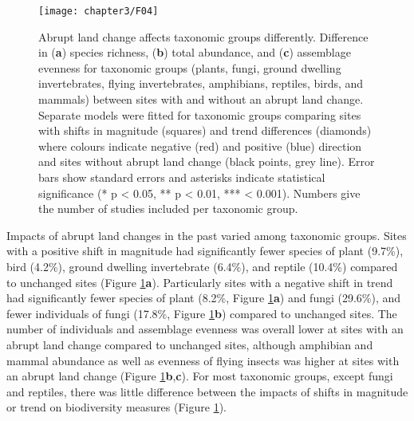 \begin{figure}[!htb]
\centering
\texttt{[image: chapter3/F04]}
\caption{Abrupt land change affects taxonomic groups differently. Difference in (\textbf{a}) species richness, (\textbf{b}) total abundance, and (\textbf{c}) assemblage evenness for taxonomic groups (plants, fungi, ground dwelling invertebrates, flying invertebrates, amphibians, reptiles, birds, and mammals) between sites with and without an abrupt land change. Separate models were fitted for taxonomic groups comparing sites with shifts in magnitude (squares) and trend differences (diamonds) where colours indicate negative (red) and positive (blue) direction and sites without abrupt land change (black points, grey line). Error bars show standard errors and asterisks indicate statistical significance (* p < 0.05, ** p < 0.01, *** < 0.001). Numbers give the number of studies included per taxonomic group.}
\label{F03_04}
\end{figure}

Impacts of abrupt land changes in the past varied among taxonomic groups. Sites with a positive shift in magnitude had significantly fewer species of plant (9.7\%), bird (4.2\%), ground dwelling invertebrate (6.4\%), and reptile (10.4\%) compared to unchanged sites (Figure \ref{F03_04}\textbf{a}). Particularly sites with a negative shift in trend had significantly fewer species of plant (8.2\%, Figure \ref{F03_04}\textbf{a}) and fungi (29.6\%), and fewer individuals of fungi (17.8\%, Figure \ref{F03_04}\textbf{b}) compared to unchanged sites. The number of individuals and assemblage evenness was overall lower at sites with an abrupt land change compared to unchanged sites, although amphibian and mammal abundance as well as evenness of flying insects was higher at sites with an abrupt land change (Figure \ref{F03_04}\textbf{b},\textbf{c}). For most taxonomic groups, except fungi and reptiles, there was little difference between the impacts of shifts in magnitude or trend on biodiversity measures (Figure \ref{F03_04}).

